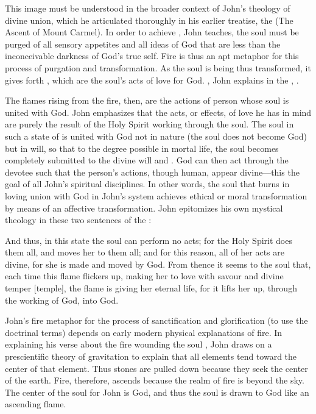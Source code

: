 This image must be understood in the broader context of John's theology of divine union, which he articulated thoroughly in his earlier treatise, the  (The Ascent of Mount Carmel).%
In order to achieve , John teaches, the soul must be purged of all sensory appetites and all ideas of God that are less than the inconceivable darkness of God's true self.
Fire is thus an apt metaphor for this process of purgation and transformation.
As the soul is being thus transformed, it gives forth , which are the soul's acts of love for God.
, John explains in the , .%
	\Autocite[790]{JuandelaCruz:Llama}

The flames rising from the fire, then, are the actions of person whose soul is united with God.
John emphasizes that the acts, or effects, of love he has in mind are purely the result of the Holy Spirit working through the soul.
The soul in such a state of  is united with God not in nature (the soul does not become God) but in will, so that to the degree possible in mortal life, the soul becomes completely submitted to the divine will and .%
	\Autocite[227]{JuandelaCruz:Subida}
God can then act through the devotee such that the person's actions, though human, appear divine---this the goal of all John's spiritual disciplines.%
	\Autocite[226--230]{JuandelaCruz:Subida}
In other words, the soul that burns in loving union with God in John's system achieves ethical or moral transformation by means of an affective transformation. 
John epitomizes his own mystical theology in these two sentences of the :
\begin{quoting}
And thus, in this state the soul can perform no acts; for the Holy Spirit does them all, and moves her to them all; and for this reason, all of her acts are divine, for she is made and moved by God. 
From thence it seems to the soul that, each time this flame flickers up, making her to love with savour and divine temper [temple], the flame is giving her eternal life, for it lifts her up, through the working of God, into God.%
	\Autocite[791]{JuandelaCruz:Llama}
\end{quoting}

John's fire metaphor for the process of sanctification and glorification (to use the doctrinal terms) depends on early modern physical explanations of fire.
In explaining his verse about the fire wounding the soul , John draws on a prescientific theory of gravitation to explain that all elements tend toward the center of that element.%
	\Autocite[792--795]{JuandelaCruz:Llama}
Thus stones are pulled down because they seek the center of the earth.
Fire, therefore, ascends because the realm of fire is beyond the sky.
The center of the soul for John is God, and thus the soul is drawn to God like an ascending flame.

